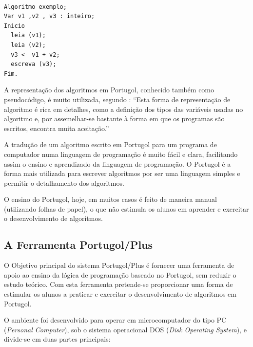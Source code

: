 

\begin{lstlisting}[]  % Start your code-block

Algoritmo exemplo;
Var v1 ,v2 , v3 : inteiro;
Inicio
  leia (v1);
  leia (v2);
  v3 <- v1 + v2;
  escreva (v3);
Fim.
\end{lstlisting}

A representação dos algoritmos em Portugol, conhecido também como pseudocódigo,
é muito utilizada, segundo \cite[p.~6]{saliba1992}: ``Esta forma de
representação de algoritmo é rica em detalhes, como a definição dos tipos das
variáveis usadas no algoritmo e, por assemelhar-se bastante à forma em que os
programas são escritos, encontra muita aceitação.''

A tradução de um algoritmo escrito em Portugol para um programa de computador
numa linguagem de programação é muito fácil e clara, facilitando assim o ensino
e aprendizado da linguagem de programação. O Portugol é a forma mais utilizada
para escrever algoritmos por ser uma linguagem simples e permitir o
detalhamento dos algoritmos.

O ensino do Portugol, hoje, em muitos casos é feito de maneira manual
(utilizando folhas de papel), o que não estimula os alunos em aprender e
exercitar o desenvolvimento de algoritmos.

\subsection{A Ferramenta Portugol/Plus}

O Objetivo principal do sistema Portugol/Plus é fornecer uma ferramenta de apoio
ao ensino da lógica de programação baseado no Portugol, sem reduzir o estudo
teórico. Com esta ferramenta pretende-se proporcionar uma forma de estimular os
alunos a praticar e exercitar o desenvolvimento de algoritmos em Portugol.

O ambiente foi desenvolvido para operar em microcomputador do tipo PC
(\textit{Personal Computer}), sob o sistema operacional DOS
(\textit{Disk Operating System}), e divide-se em duas partes principais:

